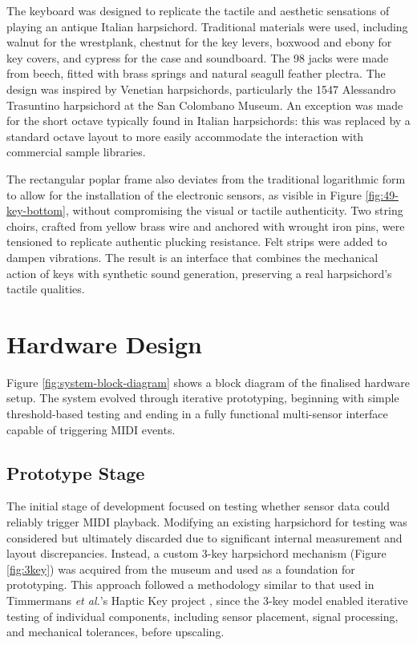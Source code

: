 The keyboard was designed to replicate the tactile and aesthetic sensations of playing an antique Italian harpsichord. Traditional materials were used, including walnut for the wrestplank, chestnut for the key levers, boxwood and ebony for key covers, and cypress for the case and soundboard. The 98 jacks were made from beech, fitted with brass springs and natural seagull feather plectra. The design was inspired by Venetian harpsichords, particularly the 1547 Alessandro Trasuntino harpsichord at the San Colombano Museum. An exception was made for the short octave typically found in Italian harpsichords: this was replaced by a standard octave layout to more easily accommodate the interaction with commercial sample libraries. 

The rectangular poplar frame also deviates from the traditional logarithmic form to allow for the installation of the electronic sensors, as visible in Figure \ref{fig:49-key-bottom}, without compromising the visual or tactile authenticity. Two string choirs, crafted from yellow brass wire and anchored with wrought iron pins, were tensioned to replicate authentic plucking resistance. Felt strips were added to dampen vibrations. The result is an interface that combines the mechanical action of keys with synthetic sound generation, preserving a real harpsichord's tactile qualities.


\section{Hardware Design}\label{hardware-design}

Figure \ref{fig:system-block-diagram} shows a block diagram of the finalised hardware setup. The system evolved through iterative prototyping, beginning with simple threshold-based testing and ending in a fully functional multi-sensor interface capable of triggering MIDI events. 

\subsection{Prototype Stage}

The initial stage of development focused on testing whether sensor data could reliably trigger MIDI playback. Modifying an existing harpsichord for testing was considered but ultimately discarded due to significant internal measurement and layout discrepancies. Instead, a custom 3-key harpsichord mechanism (Figure \ref{fig:3key}) was acquired from the museum and used as a foundation for prototyping. This approach followed a methodology similar to that used in Timmermans \emph{et al.}'s Haptic Key project \cite{Timmermans2020}, since the 3-key model enabled iterative testing of individual components, including sensor placement, signal processing, and mechanical tolerances, before upscaling. 

